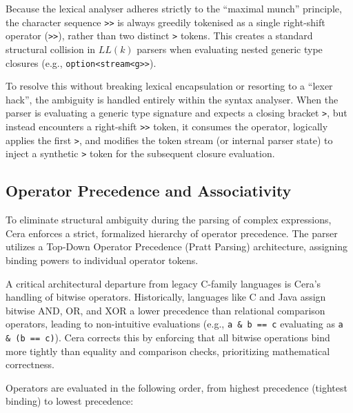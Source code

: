 \documentclass[11pt, a4paper]{article}
\begin{document}
Because the lexical analyser adheres strictly to the ``maximal munch'' principle, the character sequence \texttt{>>} is always greedily tokenised as a single right-shift operator (\texttt{>>}), rather than two distinct \texttt{>} tokens. This creates a standard structural collision in $LL(k)$ parsers when evaluating nested generic type closures (e.g., \texttt{option<stream<g>>}).

To resolve this without breaking lexical encapsulation or resorting to a ``lexer hack'', the ambiguity is handled entirely within the syntax analyser. When the parser is evaluating a generic type signature and expects a closing bracket \texttt{>}, but instead encounters a right-shift \texttt{>>} token, it consumes the operator, logically applies the first \texttt{>}, and modifies the token stream (or internal parser state) to inject a synthetic \texttt{>} token for the subsequent closure evaluation.

\subsection{Operator Precedence and Associativity}

\noindent
To eliminate structural ambiguity during the parsing of complex expressions, Cera enforces a strict, formalized hierarchy of operator precedence. The parser utilizes a Top-Down Operator Precedence (Pratt Parsing) architecture, assigning binding powers to individual operator tokens.

A critical architectural departure from legacy C-family languages is Cera's handling of bitwise operators. Historically, languages like C and Java assign bitwise AND, OR, and XOR a lower precedence than relational comparison operators, leading to non-intuitive evaluations (e.g., \texttt{a \& b == c} evaluating as \texttt{a \& (b == c)}). Cera corrects this by enforcing that all bitwise operations bind more tightly than equality and comparison checks, prioritizing mathematical correctness.

Operators are evaluated in the following order, from highest precedence (tightest binding) to lowest precedence:
\end{document}
